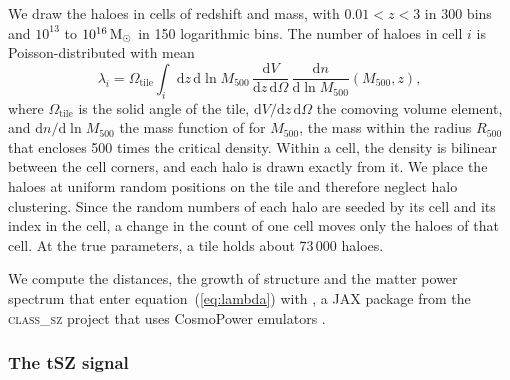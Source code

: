 We draw the haloes in cells of redshift and mass, with $0.01<z<3$ in 300 bins and $10^{13}$ to
$10^{16}\,\mathrm{M}_\odot$ in 150 logarithmic bins. The number of haloes in cell $i$ is Poisson-distributed with mean
\begin{equation}
\lambda_i = \Omega_\mathrm{tile}\int_i \mathrm{d}z\,\mathrm{d}\ln M_{500}\,
\frac{\mathrm{d}V}{\mathrm{d}z\,\mathrm{d}\Omega}\,
\frac{\mathrm{d}n}{\mathrm{d}\ln M_{500}}(M_{500},z),
\label{eq:lambda}
\end{equation}
where $\Omega_\mathrm{tile}$ is the solid angle of the tile, $\mathrm{d}V/\mathrm{d}z\,\mathrm{d}\Omega$ the
comoving volume element, and $\mathrm{d}n/\mathrm{d}\ln M_{500}$ the mass function of \citet{Tinker2008}
for $M_{500}$, the mass within the radius $R_{500}$ that encloses 500 times the critical density. Within a
cell, the density is bilinear between the cell corners, and each halo is drawn exactly from it. We place
the haloes at uniform random positions on the tile and therefore neglect halo clustering. Since the random
numbers of each halo are seeded by its cell and its index in the cell, a change in the count of one cell
moves only the haloes of that cell. At the true parameters, a tile holds about 73\,000 haloes.

We compute the distances, the growth of structure and the matter power spectrum that enter
equation~(\ref{eq:lambda}) with \classyszlite{}, a JAX \citep{Bradbury2018} package from the
\textsc{class\_sz} project \citep{Bolliet2023} that uses CosmoPower emulators \citep{SpurioMancini2022}.

\subsubsection{The tSZ signal}

